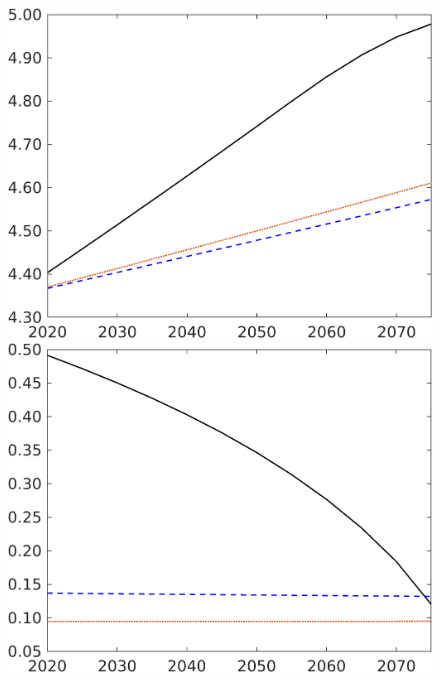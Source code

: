\begin{figure}[h!!]
\begin{minipage}[]{0.32\textwidth}
	\end{minipage}
	\begin{minipage}[]{0.32\textwidth}
		\includegraphics[width=1\textwidth]{../../codding_model/own_basedOnFried/optimalPol_elastS_DisuSci/figures/all_1705/Extern_CompEff_An_spillover0_noskill0_sep1_BN0_ineq0_red0_etaa0.79_lgd0.png}
	\end{minipage}
	\begin{minipage}[]{0.32\textwidth}
		\includegraphics[width=1\textwidth]{../../codding_model/own_basedOnFried/optimalPol_elastS_DisuSci/figures/all_1705/Extern_CompEff_sg_spillover0_noskill0_sep1_BN0_ineq0_red0_etaa0.79_lgd0.png}

\end{minipage}
\end{figure}
